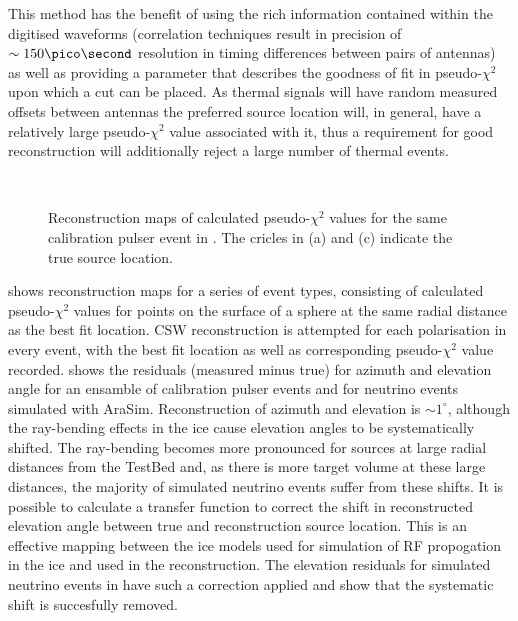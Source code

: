  This method has the benefit of using the rich information contained within the digitised waveforms (correlation techniques result in precision of $\sim 150 \pico \second$ resolution in timing differences between pairs of antennas) as well as providing a parameter that describes the goodness of fit in pseudo-$\chi^2$ upon which a cut can be placed. As thermal signals will have random measured offsets between antennas the preferred source location will, in general, have a relatively large pseudo-$\chi^2$ value associated with it, thus a requirement for good reconstruction will additionally reject a large number of thermal events.

\begin{figure}[htpb]
  \hfill
  \\
  \caption{Reconstruction maps of calculated pseudo-$\chi^{2}$ values for the same calibration pulser event in . The cricles in (a) and (c) indicate the true source location.}
  \label{fig:analysis:Reconstruction:CSW-ChiSq-Example}
\end{figure}

 shows reconstruction maps for a series of event types, consisting of calculated pseudo-$\chi^{2}$ values for points on the surface of a sphere at the same radial distance as the best fit location. CSW reconstruction is attempted for each polarisation in every event, with the best fit location as well as corresponding pseudo-$\chi^{2}$ value recorded.  shows the residuals (measured minus true) for azimuth and elevation angle for an ensamble of calibration pulser events and for neutrino events simulated with AraSim. Reconstruction of azimuth and elevation is $\sim 1^{\circ}$, although the ray-bending effects in the ice cause elevation angles to be systematically shifted. The ray-bending becomes more pronounced for sources at large radial distances from the TestBed and, as there is more target volume at these large distances, the majority of simulated neutrino events  suffer from these shifts. It is possible to calculate a transfer function to correct the shift in reconstructed elevation angle between true and reconstruction source location. This is an effective mapping between the ice models used for simulation of RF propogation in the ice and used in the reconstruction. The elevation residuals for simulated neutrino events in  have such a correction applied and show that the systematic shift is succesfully removed.


